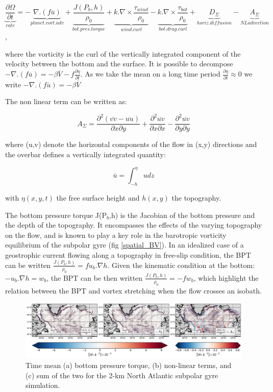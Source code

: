 \documentclass[11pt,a4paper]{article}
\begin{document}
$$\underbrace{\frac{\partial \Omega}{\partial t}}_{rate} = -\underbrace{\nabla.(f\overline{u})}_{planet.vort.adv}+\underbrace{\frac{J(P_b,h)}{\rho _0}}_{bot.pres.torque} +\underbrace{k.\nabla \times \frac{\tau _{wind}}{\rho_{0}}}_{wind.curl} -\underbrace{k.\nabla \times \frac{\tau _{bot}}{\rho_{0}}}_{bot.drag.curl} +\underbrace{D_{\Sigma}}_{horiz.diffusion}-\underbrace{A_{\Sigma}}_{NL advection}$$,

where the vorticity is the curl of the vertically integrated component of the velocity between the bottom and the surface. It is possible to decompose $-\nabla.(f\overline{u})=-\beta \overline{V}-f \frac{\partial \eta}{\partial t}$. As we take the mean on a long time period $\frac{\partial \eta}{\partial t} \approx 0$ we write  $-\nabla.(f\overline{u})= - \beta \overline{V}$

The non linear term can be written as:

$$A_{\Sigma}= \frac{\partial ^2 (\overline{vv}-\overline{uu})}{\partial x \partial y}+\frac{\partial ^2 \overline{uv}}{\partial x \partial x} -\frac{\partial ^2 \overline{uv}}{\partial y \partial y}$$

where (u,v) denote the horizontal components of the flow in (x,y) directions and the overbar defines a vertically integrated quantity:

$$\overline{u}=\int^{\eta}_{-h} u dz$$

with $\eta(x,y,t)$ the free surface height and $h(x,y)$ the topography. 

The bottom pressure torque J(P$_b$,h) is the Jacobian of the bottom pressure and the depth of the topography. It encompasses the effects of the varying topography on the flow, and is known to play a key role in the barotropic vorticity equilibrium of the subpolar gyre (fig \ref{spatial_BV}). In an idealized case of a geostrophic current flowing along a topography in free-slip condition, the BPT can be written $\frac{J(P_b,h)}{\rho _0}=f u_b.\nabla h$. Given the kinematic condition at the bottom: $-u_b . \nabla h =w_b$, the BPT can be then written $\frac{J(P_b,h)}{\rho _0}=-fw_b$, which highlight the relation between the BPT and vortex stretching when the flow crosses an isobath.

\begin{figure}[H]
\centerline{\includegraphics[width=20cm]{./v_b/BPT_NL_sum.png}}
\caption{Time mean (a) bottom pressure torque, (b) non-linear terms, and (c) sum of the two for the 2-km North Atlantic subpolar gyre simulation.}
\label{BPT_NL_unsmoothed}
\end{figure} 
\end{document}
